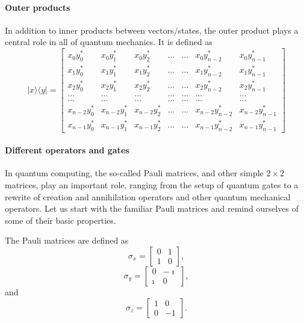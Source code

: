 \paragraph{Outer products}

In addition to inner products between vectors/states, the outer
product plays a central role in all of quantum mechanics. It is
defined as
\[
\vert x\rangle \langle y \vert = \begin{bmatrix}
               x_0y_0^* & x_0y_1^* & x_0y_2^* & \dots & \dots & x_0y_{n-2}^* & x_0y_{n-1}^* \\
	       x_1y_0^* & x_1y_1^* & x_1y_2^* & \dots & \dots & x_1y_{n-2}^* & x_1y_{n-1}^* \\
	       x_2y_0^* & x_2y_1^* & x_2y_2^* & \dots & \dots & x_2y_{n-2}^* & x_2y_{n-1}^* \\	       
               \dots &   \dots   & \dots  & \dots & \dots & \dots & \dots \\
               \dots &   \dots   & \dots  & \dots & \dots & \dots & \dots \\	       
	       x_{n-2}y_0^* & x_{n-2}y_1^* & x_{n-2}y_2^* & \dots & \dots & x_{n-2}y_{n-2}^* & x_{n-2}y_{n-1}^* \\
	       x_{n-1}y_0^* & x_{n-1}y_1^* & x_{n-1}y_2^* & \dots & \dots & x_{n-1}y_{n-2}^* & x_{n-1}y_{n-1}^* \end{bmatrix}	       
\]


\paragraph{Different operators and gates}

In quantum computing, the so-called Pauli matrices, and other simple
$2\times 2$ matrices, play an important role, ranging from the setup
of quantum gates to a rewrite of creation and annihilation operators
and other quantum mechanical operators. Let us start with the familiar
Pauli matrices and remind ourselves of some of their basic properties.

The Pauli matrices are defined as
\[
\sigma_x = \begin{bmatrix} 0 & 1 \\ 1 & 0 \end{bmatrix},
\]
\[
\sigma_y = \begin{bmatrix} 0 & -\imath \\ \imath & 0 \end{bmatrix},
\]
and
\[
\sigma_z = \begin{bmatrix} 1 & 0 \\ 0 & -1 \end{bmatrix}.
\]


